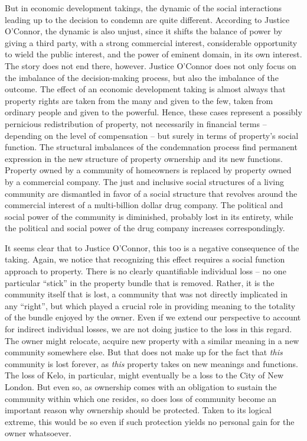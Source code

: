 But in economic development takings, the dynamic of the social interactions leading up to the decision to condemn are quite different. According to Justice O'Connor, the dynamic is also unjust, since it shifts the balance of power by giving a third party, with a strong commercial interest, considerable opportunity to wield the public interest, and the power of eminent domain, in its own interest. The story does not end there, however. Justice O'Connor does not only focus on the imbalance of the decision-making process, but also the imbalance of the outcome.  The effect of an economic development taking is almost always that property rights are taken from the many and given to the few, taken from ordinary people and given to the powerful. Hence, these cases represent a possibly pernicious redistribution of property, not necessarily in financial terms -- depending on the level of compensation -- but surely in terms of property's social function. The structural imbalances of the condemnation process find permanent expression in the new structure of property ownership and its new functions. Property owned by a community of homeowners is replaced by property owned by a commercial company. The just and inclusive social structures of a living community are dismantled in favor of a social structure that revolves around the commercial interest of a multi-billion dollar drug company. The political and social power of the community is diminished, probably lost in its entirety, while the political and social power of the drug company increases correspondingly.

 It seems clear that to Justice O'Connor, this too is a negative consequence of the taking. Again, we notice that recognizing this effect requires a social function approach to property. There is no clearly quantifiable individual loss -- no one particular ``stick'' in the property bundle that is removed. Rather, it is the community itself that is lost, a community that was not directly implicated in any ``right'', but which played a crucial role in providing meaning to the totality of the bundle enjoyed by the owner. Even if we extend our perspective to account for indirect individual losses, we are not doing justice to the loss in this regard. The owner might relocate, acquire new property with a similar meaning in a new community somewhere else. But that does not make up for the fact that {\it this} community is lost forever, as {\it this} property takes on new meanings and functions. The loss of Kelo, in particular, might eventually be a loss to the City of New London. But even so, as ownership comes with an obligation to sustain the community within which one resides, so does loss of community become an important reason why ownership should be protected. Taken to its logical extreme, this would be so even if such protection yields no personal gain for the owner whatsoever.

